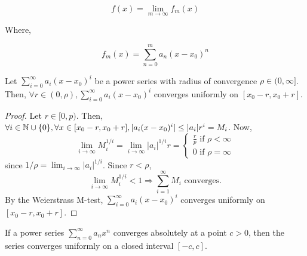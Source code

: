 \begin{equation*}
    f(x) = \lim \limits_{m \to \infty} f_m(x)
\end{equation*}

Where,

\begin{equation*}
    f_m(x) = \sum \limits_{n=0}^m a_n(x-x_0)^n
\end{equation*}

\begin{theorem}
    Let $\sum_{i=0}^\infty a_i(x - x_0)^i$ be a power series with radius of convergence $\rho \in (0, \infty]$. Then,  $\forall r \in (0, \rho), \sum_{i=0}^\infty a_i(x - x_0)^i$ converges uniformly on $[x_0 - r, x_0 + r]$.
\end{theorem}

\begin{proof}
    Let $r \in [0, p)$. Then, $\forall i \in \mathbb{N} \cup \{0\}, \forall x \in [x_0 - r, x_0 + r], |a_i(x-x_0)^i| \leq |a_i|r^i = M_i$. Now,
    \begin{equation*}
        \lim \limits_{i \to \infty} M_i^{1/i} = \lim \limits_{i \to \infty} |a_i|^{1/i} r = \begin{cases}
            \frac{r}{p} \text{ if } \rho < \infty \\
            0 \text{ if } \rho = \infty
        \end{cases}
    \end{equation*}
    since $1/\rho = \lim_{i \to \infty} |a_i|^{1/i}$. Since $r < \rho$,
    \begin{equation*}
        \lim \limits_{i \to \infty} M_i^{1/i} < 1 \Longrightarrow \sum \limits_{i=1}^\infty M_i \text{ converges.}
    \end{equation*}
    By the Weierstrass M-test, $\sum_{i=0}^\infty a_i(x-x_0)^i$ converges uniformly on $[x_0 - r, x_0 + r]$.
\end{proof}

\begin{theorem}
    If a power series $\sum_{n=0}^\infty a_n x^n$ converges absolutely at a point $c > 0$, then the series converges uniformly on a closed interval $[-c, c]$.
\end{theorem}

